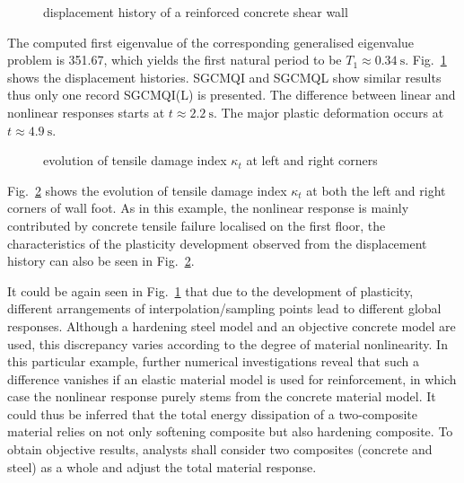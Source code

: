 \documentclass[3p,sort&compress,review,11pt,fleqn]{elsarticle}
\newcommand*{\figref}[1]{Fig.~\ref{#1}}
\begin{document}
\begin{figure}[htb]
\centering\scriptsize

\caption{displacement history of a reinforced concrete shear wall}\label{fig:rc_wall_disp}
\end{figure}
The computed first eigenvalue of the corresponding generalised eigenvalue problem is \num{351.67}, which yields the first natural period to be $T_1\approx\SI{0.34}{\second}$. \figref{fig:rc_wall_disp} shows the displacement histories. SGCMQI and SGCMQL show similar results thus only one record SGCMQI(L) is presented. The difference between linear and nonlinear responses starts at $t\approx\SI{2.2}{\second}$. The major plastic deformation occurs at $t\approx\SI{4.9}{\second}$.

\begin{figure}[htb]
\centering\scriptsize

\caption{evolution of tensile damage index $\kappa_t$ at left and right corners}\label{fig:rc_wall_kappat}
\end{figure}
\figref{fig:rc_wall_kappat} shows the evolution of tensile damage index $\kappa_t$ at both the left and right corners of wall foot. As in this example, the nonlinear response is mainly contributed by concrete tensile failure localised on the first floor, the characteristics of the plasticity development observed from the displacement history can also be seen in \figref{fig:rc_wall_kappat}.

It could be again seen in \figref{fig:rc_wall_disp} that due to the development of plasticity, different arrangements of interpolation/sampling points lead to different global responses. Although a hardening steel model and an objective concrete model are used, this discrepancy varies according to the degree of material nonlinearity. In this particular example, further numerical investigations reveal that such a difference vanishes if an elastic material model is used for reinforcement, in which case the nonlinear response purely stems from the concrete material model. It could thus be inferred that the total energy dissipation of a two-composite material relies on not only softening composite but also hardening composite. To obtain objective results, analysts shall consider two composites (concrete and steel) as a whole and adjust the total material response.
\end{document}
